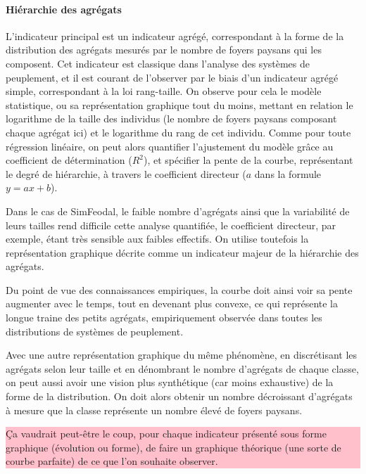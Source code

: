 \documentclass[12pt, a4paper, oneside]{book}
\begin{document}
	
	\paragraph{Hiérarchie des agrégats}
	
	L'indicateur principal est un indicateur agrégé, correspondant à la forme de la distribution des agrégats mesurés par le nombre de foyers paysans qui les composent. Cet indicateur est classique dans l'analyse des systèmes de peuplement, et il est courant de l'observer par le biais d'un indicateur agrégé simple, correspondant à la loi rang-taille. On observe pour cela le modèle statistique, ou sa représentation graphique tout du moins, mettant en relation le logarithme de la taille des individus (le nombre de foyers paysans composant chaque agrégat ici) et le logarithme du rang de cet individu. Comme pour toute régression linéaire, on peut alors quantifier l'ajustement du modèle grâce au coefficient de détermination ($R^2$), et spécifier la pente de la courbe, représentant le degré de hiérarchie, à travers le coefficient directeur ($a$ dans la formule $y = ax + b$).
	
	Dans le cas de SimFeodal, le faible nombre d'agrégats ainsi que la variabilité de leurs tailles rend difficile cette analyse quantifiée, le coefficient directeur, par exemple, étant très sensible aux faibles effectifs. On utilise toutefois la représentation graphique décrite comme un indicateur majeur de la hiérarchie des agrégats.
	
	Du point de vue des connaissances empiriques, la courbe doit ainsi voir sa pente augmenter avec le temps, tout en devenant plus convexe, ce qui représente la \og longue traine\fg{} des petits agrégats, empiriquement observée dans toutes les distributions de systèmes de peuplement.
	
	Avec une autre représentation graphique du même phénomène, en discrétisant les agrégats selon leur taille et en dénombrant le nombre d'agrégats de chaque classe, on peut aussi avoir une vision plus synthétique (car moins exhaustive) de la forme de la distribution. On doit alors obtenir un nombre décroissant d'agrégats à mesure que la classe représente un nombre élevé de foyers paysans.
	
	\colorbox{pink}{\parbox{0.9\textwidth}{%
		\vskip5pt
			Ça vaudrait peut-être le coup, pour chaque indicateur présenté sous forme graphique (évolution ou forme), de faire un graphique théorique (une sorte de courbe parfaite) de ce que l'on souhaite observer.
			\vskip5pt
		}
	}
	
\end{document}
